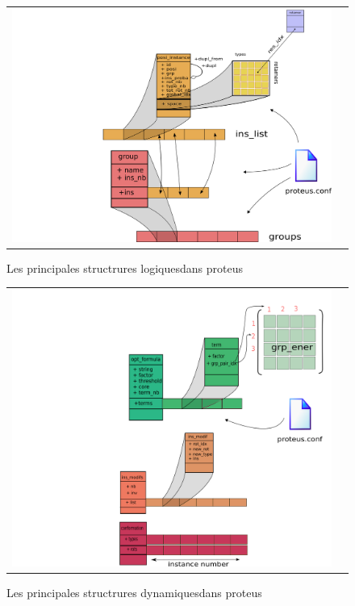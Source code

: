    \begin{figure}[t]
     \centering
     \begin{tabular}{cc}
       \includegraphics[width=12cm]{graphe/proteus/structures_modele_logique.png} &
     \end{tabular}
     
     \caption{Les principales structrures \og logiques\fg dans proteus}
\label{graph:struct_log}
   \end{figure}



   \begin{figure}[t]
     \centering
     \begin{tabular}{cc}
       \includegraphics[width=12cm]{graphe/proteus/structures_dynamiques.png} &
     \end{tabular}
     
     \caption{Les principales structrures \og dynamiques\fg dans proteus}
\label{graph:struct_Dyna}
   \end{figure}


